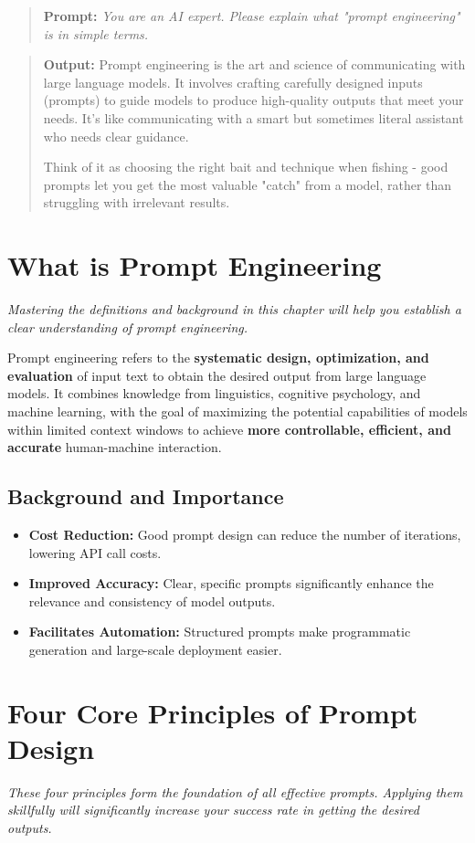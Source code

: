 \documentclass[12pt]{article}
\newcommand{\prompt}[1]{\begin{quote}\textbf{Prompt:} \textit{#1}\end{quote}}
\newcommand{\modeloutput}[1]{\begin{quote}\textbf{Output:} #1\end{quote}}
\newcommand{\chapternote}[1]{\textit{\small #1}}
\begin{document}
\prompt{You are an AI expert. Please explain what "prompt engineering" is in simple terms.}

\modeloutput{Prompt engineering is the art and science of communicating with large language models. It involves crafting carefully designed inputs (prompts) to guide models to produce high-quality outputs that meet your needs. It's like communicating with a smart but sometimes literal assistant who needs clear guidance.

Think of it as choosing the right bait and technique when fishing - good prompts let you get the most valuable "catch" from a model, rather than struggling with irrelevant results.}

\section{What is Prompt Engineering}
\chapternote{Mastering the definitions and background in this chapter will help you establish a clear understanding of prompt engineering.}

Prompt engineering refers to the \textbf{systematic design, optimization, and evaluation} of input text to obtain the desired output from large language models. It combines knowledge from linguistics, cognitive psychology, and machine learning, with the goal of maximizing the potential capabilities of models within limited context windows to achieve \textbf{more controllable, efficient, and accurate} human-machine interaction.

\subsection{Background and Importance}
\begin{itemize}[leftmargin=2em]
  \item \textbf{Cost Reduction:} Good prompt design can reduce the number of iterations, lowering API call costs.
  \item \textbf{Improved Accuracy:} Clear, specific prompts significantly enhance the relevance and consistency of model outputs.
  \item \textbf{Facilitates Automation:} Structured prompts make programmatic generation and large-scale deployment easier.
\end{itemize}

\section{Four Core Principles of Prompt Design}
\chapternote{These four principles form the foundation of all effective prompts. Applying them skillfully will significantly increase your success rate in getting the desired outputs.}
\end{document}
